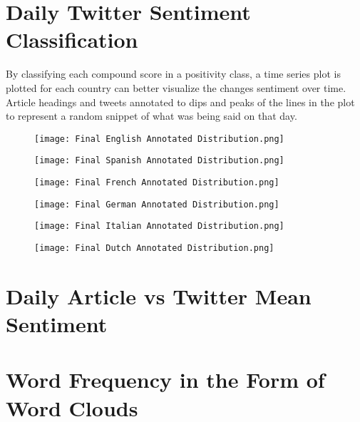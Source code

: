 \section{Daily Twitter Sentiment Classification}

By classifying each compound score in a positivity class, a time series plot is plotted for each country can better visualize the changes sentiment over time.
Article headings and tweets annotated to dips and peaks of the lines in the plot to represent a random snippet of what was being said on that day.

\begin{figure}[h!]
\texttt{[image: Final English Annotated Distribution.png]}
\caption[English Annotated Sentiment Distribution]{ }
\label{fig:English}
\end{figure}

\begin{figure}[h!]
\texttt{[image: Final Spanish Annotated Distribution.png]}
\caption[English Annotated Sentiment Distribution]{ }
\label{fig:Spanish}
\end{figure}

\begin{figure}[h!]
\texttt{[image: Final French Annotated Distribution.png]}
\caption[Final French Annotated Distribution]{ }
\label{fig:French}
\end{figure}

\begin{figure}[h!]
\texttt{[image: Final German Annotated Distribution.png]}
\caption[Final German Annotated Distribution]{ }
\label{fig:German}
\end{figure}

\begin{figure}[h!]
\texttt{[image: Final Italian Annotated Distribution.png]}
\caption[Final Italian Annotated Distribution]{ }
\label{fig:Italian}
\end{figure}

\begin{figure}[h!]
\texttt{[image: Final Dutch Annotated Distribution.png]}
\caption[Final Dutch Annotated Distribution]{ }
\label{fig:Dutch}
\end{figure}


\section{Daily Article vs Twitter Mean Sentiment}



\section{Word Frequency in the Form of Word Clouds}

